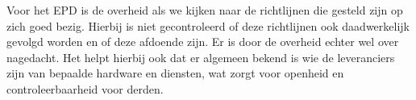 Voor het EPD is de overheid als we kijken naar de richtlijnen die gesteld zijn op zich goed bezig. Hierbij is niet gecontroleerd of deze richtlijnen ook daadwerkelijk gevolgd worden en of deze afdoende zijn. Er is door de overheid echter wel over nagedacht. Het helpt hierbij ook dat er algemeen bekend is wie de leveranciers zijn van bepaalde hardware en diensten, wat zorgt voor openheid en controleerbaarheid voor derden.
